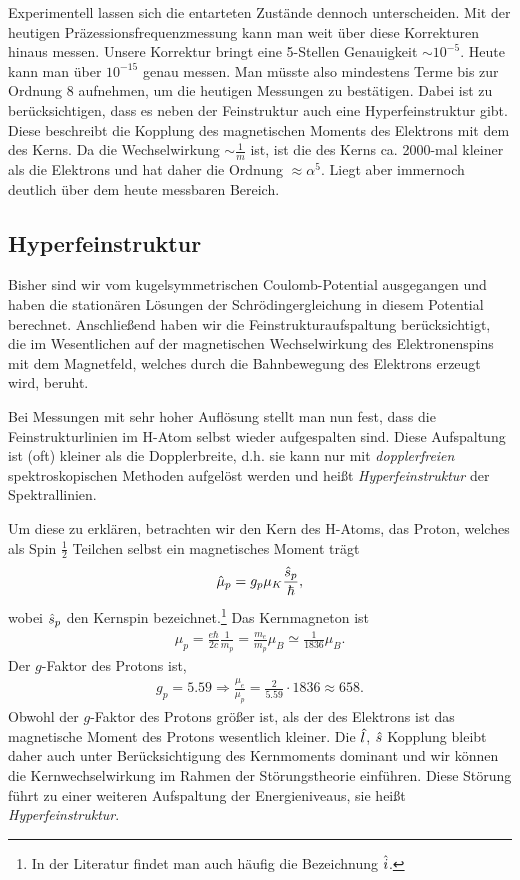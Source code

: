 Experimentell lassen sich die entarteten Zustände dennoch unterscheiden. Mit der
heutigen Präzessionsfrequenzmessung kann man weit über diese Korrekturen hinaus
messen. Unsere Korrektur bringt eine 5-Stellen Genauigkeit $\sim 10^{-5}$.
Heute kann man über $10^{-15}$ genau messen. Man müsste also mindestens Terme
bis zur Ordnung 8 aufnehmen, um die heutigen Messungen zu bestätigen.
Dabei ist zu berücksichtigen, dass es neben der Feinstruktur auch
eine Hyperfeinstruktur gibt. Diese beschreibt die Kopplung des magnetischen
Moments des Elektrons mit dem des Kerns. Da die Wechselwirkung
$\sim\frac{1}{m}$ ist, ist die des Kerns ca. 2000-mal kleiner als die Elektrons
und hat daher die Ordnung $\approx \alpha^5$. Liegt aber immernoch deutlich
über dem heute messbaren Bereich.


\subsection{Hyperfeinstruktur}


Bisher sind wir vom kugelsymmetrischen Coulomb-Potential ausgegangen
und haben die stationären Lösungen der Schrödingergleichung in diesem
Potential berechnet. Anschließend haben wir die Feinstrukturaufspaltung
berücksichtigt, die im Wesentlichen auf der magnetischen Wechselwirkung des
Elektronenspins mit dem Magnetfeld, welches durch die Bahnbewegung des
Elektrons erzeugt wird, beruht.

Bei Messungen mit sehr hoher Auflösung stellt man nun fest, dass die
Feinstrukturlinien im H-Atom selbst wieder aufgespalten sind. Diese Aufspaltung
ist (oft) kleiner als die Dopplerbreite, d.h. sie kann nur mit
\textit{dopplerfreien} spektroskopischen Methoden aufgelöst werden und heißt \emph{Hyperfeinstruktur}
der Spektrallinien.

Um diese zu erklären, betrachten wir den Kern des H-Atoms, das Proton, welches
als Spin $\frac{1}{2}$ Teilchen selbst ein magnetisches Moment trägt
\begin{align*}
\hat{\boldmath{\mu}}_p = g_p \mu_K \frac{\hat{\boldmath{s}}_p}{\hbar},
\end{align*}
wobei $\hat{\boldmath{s}}_p$ den Kernspin bezeichnet.\footnote{In der Literatur findet man
auch häufig die Bezeichnung $\hat{\boldmath{i}}$.} Das Kernmagneton ist
\begin{align*}
\mu_p = \frac{e\hbar}{2 c}\frac{1}{m_p} = \frac{m_e}{m_p} \mu_B \simeq
\frac{1}{1836}\mu_B.
\end{align*}
Der $g$-Faktor des Protons ist,
\begin{align*}
g_p = 5.59 \Rightarrow \frac{\mu_e}{\mu_p} = \frac{2}{5.59}\cdot 1836 \approx
658.
\end{align*}
Obwohl der $g$-Faktor des Protons größer ist, als der des Elektrons ist das
magnetische Moment des Protons wesentlich kleiner.
Die $\hat{\boldmath{l}}$, $\hat{\boldmath{s}}$ Kopplung bleibt daher auch unter Berücksichtigung des
Kernmoments dominant und wir können die Kernwechselwirkung im
Rahmen der Störungstheorie einführen. Diese Störung führt zu einer weiteren
Aufspaltung der Energieniveaus, sie heißt \emph{Hyperfeinstruktur}.

